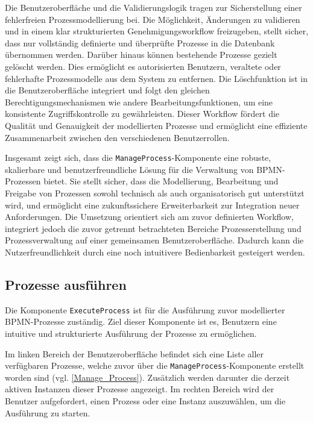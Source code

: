Die Benutzeroberfläche und die Validierungslogik tragen zur Sicherstellung einer fehlerfreien Prozessmodellierung bei. Die Möglichkeit, Änderungen zu validieren und in einem klar strukturierten Genehmigungsworkflow freizugeben, stellt sicher, dass nur vollständig definierte und überprüfte Prozesse in die Datenbank übernommen werden. Darüber hinaus können bestehende Prozesse gezielt gelöscht werden. Dies ermöglicht es autorisierten Benutzern, veraltete oder fehlerhafte Prozessmodelle aus dem System zu entfernen. Die Löschfunktion ist in die Benutzeroberfläche integriert und folgt den gleichen Berechtigungsmechanismen wie andere Bearbeitungsfunktionen, um eine konsistente Zugriffskontrolle zu gewährleisten. Dieser Workflow fördert die Qualität und Genauigkeit der modellierten Prozesse und ermöglicht eine effiziente Zusammenarbeit zwischen den verschiedenen Benutzerrollen.

Insgesamt zeigt sich, dass die \texttt{ManageProcess}-Komponente eine robuste, skalierbare und benutzerfreundliche Lösung für die Verwaltung von BPMN-Prozessen bietet. Sie stellt sicher, dass die Modellierung, Bearbeitung und Freigabe von Prozessen sowohl technisch als auch organisatorisch gut unterstützt wird, und ermöglicht eine zukunftssichere Erweiterbarkeit zur Integration neuer Anforderungen. Die Umsetzung orientiert sich am zuvor definierten Workflow, integriert jedoch die zuvor getrennt betrachteten Bereiche \glqq Prozesserstellung\grqq{} und \glqq Prozessverwaltung\grqq{} auf einer gemeinsamen Benutzeroberfläche. Dadurch kann die Nutzerfreundlichkeit durch eine noch intuitivere Bedienbarkeit gesteigert werden.


\newpage
\subsection{Prozesse ausführen}
Die Komponente \texttt{ExecuteProcess} ist für die Ausführung zuvor modellierter BPMN-Prozesse zuständig. Ziel dieser Komponente ist es, Benutzern eine intuitive und strukturierte Ausführung der Prozesse zu ermöglichen.

Im linken Bereich der Benutzeroberfläche befindet sich eine Liste aller verfügbaren Prozesse, welche zuvor über die \texttt{ManageProcess}-Komponente erstellt worden sind (vgl. \autoref{Manage_Process}). Zusätzlich werden darunter die derzeit aktiven Instanzen dieser Prozesse angezeigt. Im rechten Bereich wird der Benutzer aufgefordert, einen Prozess oder eine Instanz auszuwählen, um die Ausführung zu starten.

